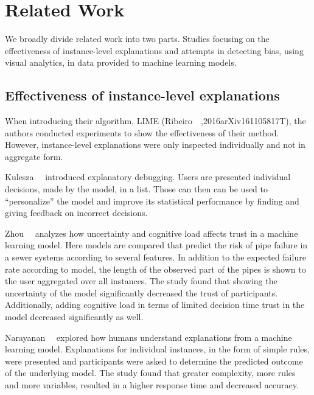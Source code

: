 \section{Related Work}
\label{sec:relatedwork}

We broadly divide related work into two parts.
Studies focusing on the effectiveness of instance-level explanations and attempts in detecting bias, using visual analytics, in data provided to machine learning models.


\subsection{Effectiveness of instance-level explanations}
When introducing their algorithm, LIME (Ribeiro~\etal~\cite{DBLP:journals/corr/RibeiroSG16, anchors:aaai18},2016arXiv161105817T), the authors conducted experiments to show the effectiveness of their method.
However, instance-level explanations were only inspected individually and not in aggregate form.

Kulesza~\etal~\cite{Kulesza:2015:PED:2678025.2701399} introduced explanatory debugging.
Users are presented individual decisions, made by the model, in a list.
Those can then can be used to ``personalize'' the model and improve its statistical performance by finding and giving feedback on incorrect decisions.

Zhou~\etal~\cite{Zhou:2017:EUC:3176444.3176447} analyzes how uncertainty and cognitive load affects trust in a machine learning model.
Here models are compared that predict the risk of pipe failure in a sewer systems according to several features.
In addition to the expected failure rate according to model, the length of the observed part of the pipes is shown to the user aggregated over all instances.
The study found that showing the uncertainty of the model significantly decreased the trust of participants.
Additionally, adding cognitive load in terms of limited decision time trust in the model decreased significantly as well.

Narayanan~\etal~\cite{2018arXiv180200682N} explored how humans understand explanations from a machine learning model.
Explanations for individual instances, in the form of simple rules, were presented and participants were asked to determine the predicted outcome of the underlying model.
The study found that greater complexity, more rules and more variables, resulted in a higher response time and decreased accuracy.

